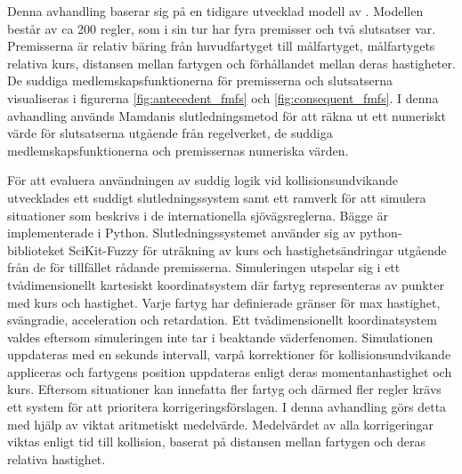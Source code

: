 Denna avhandling baserar sig på en tidigare utvecklad modell av \textcite{perera2010smooth_param,perera2012intelligent}. Modellen består av ca 200 regler, som i sin tur har fyra premisser och två slutsatser var.  Premisserna är relativ bäring från huvudfartyget till målfartyget, målfartygets relativa kurs, distansen mellan fartygen och förhållandet mellan deras hastigheter. De suddiga medlemskapsfunktionerna för premisserna och slutsatserna visualiseras i figurerna \ref{fig:antecedent_fmfs} och \ref{fig:consequent_fmfs}.  I denna avhandling används Mamdanis  slutledningsmetod för att räkna ut ett numeriskt värde för slutsatserna utgående från regelverket, de suddiga medlemskapsfunktionerna och  premissernas numeriska värden.


För att evaluera användningen av suddig logik vid kollisionsundvikande utvecklades ett suddigt slutledningssystem samt ett ramverk för att simulera situationer som beskrivs i de  internationella sjövägsreglerna. Bägge är implementerade i Python. Slutledningssystemet använder sig av python-biblioteket SciKit-Fuzzy \cite{josh_warner_2017_1002946} för uträkning av kurs och hastighetsändringar utgående från  de för tillfället rådande premisserna. Simuleringen utspelar sig i ett tvådimensionellt kartesiskt koordinatsystem där fartyg representeras av punkter med  kurs och hastighet. Varje fartyg har definierade gränser för max hastighet, svängradie, acceleration och retardation.  Ett tvådimensionellt koordinatsystem valdes eftersom simuleringen inte tar i beaktande väderfenomen. Simulationen uppdateras med en sekunds intervall, varpå  korrektioner för kollisionsundvikande appliceras och fartygens position uppdateras enligt deras momentanhastighet och kurs.   Eftersom situationer kan innefatta fler fartyg och därmed fler regler krävs ett system för att prioritera korrigeringsförslagen. I denna avhandling görs detta med hjälp av viktat aritmetiskt medelvärde. Medelvärdet av alla korrigeringar viktas enligt tid till kollision, baserat på  distansen mellan fartygen och deras relativa hastighet.




